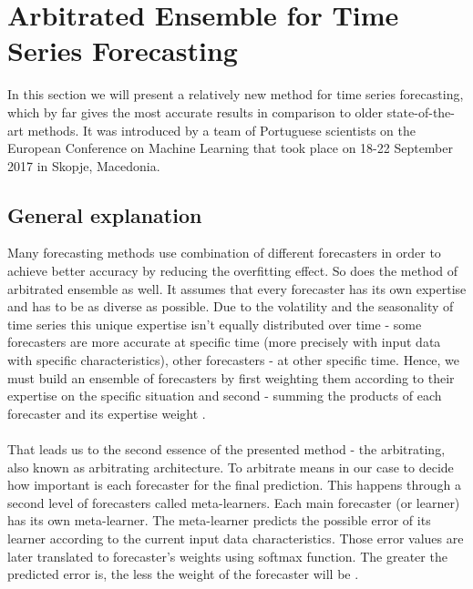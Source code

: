 \documentclass[runningheads,a4paper]{llncs}[2015/06/24]
\begin{document}
\section{Arbitrated Ensemble for Time Series Forecasting} In this section we will present a relatively new method for time series forecasting, which by far gives the most accurate results in comparison to older state-of-the-art methods. It was introduced by a team of Portuguese scientists on the European Conference on Machine Learning that took place on 18-22 September 2017 in Skopje, Macedonia. 

\subsection{General explanation}
\vspace{-\topsep}
Many forecasting methods use combination of different forecasters in order to achieve better accuracy by reducing the overfitting effect. So does the method of arbitrated ensemble as well. It assumes that every forecaster has its own expertise and has to be as diverse as possible. Due to the volatility and the seasonality of time series this unique expertise isn't equally distributed over time - some forecasters are more accurate at specific time (more precisely with input data with specific characteristics), other forecasters - at other specific time. Hence, we must build an ensemble of forecasters by first weighting them according to their expertise on the specific situation and second - summing the products of each forecaster and its expertise weight \cite{VtorCerqueira2017}. \\\\That leads us to the second essence of the presented method - the arbitrating, also known as arbitrating architecture. To arbitrate means in our case to decide how important is each forecaster for the final prediction. This happens through a second level of forecasters called meta-learners. Each main forecaster (or learner) has its own meta-learner. The meta-learner predicts the possible error of its learner according to the current input data characteristics. Those error values are later  translated to forecaster's weights using  softmax function. The greater the predicted error is, the less the weight of the forecaster will be \cite{VtorCerqueira2017}.
\vspace{-\topsep}
\end{document}
